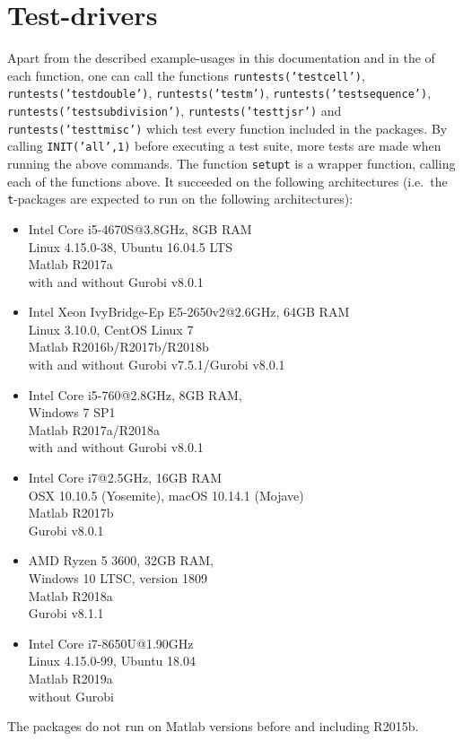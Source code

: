 \section{Test-drivers}
Apart from the described example-usages in this documentation and in the  of each function, 
one can call the functions
\texttt{runtests('testcell')},
\texttt{runtests('testdouble')},
\texttt{runtests('testm')},
\texttt{runtests('testsequence')},
\texttt{runtests('testsubdivision')},
\texttt{runtests('testtjsr')} and
\texttt{runtests('testtmisc')}
which test every function included in the packages. 
By calling \texttt{INIT('all',1)} before executing a test suite, 
more tests are made when running the above commands.
The function \texttt{setupt} is a wrapper function, calling each of the functions above.
It succeeded on the following architectures (i.e.\ the \texttt{t}-packages are expected to run on the following architectures):
\begin{itemize}
\item Intel Core i5-4670S@3.8GHz, 8GB RAM\\
Linux 4.15.0-38,
Ubuntu 16.04.5 LTS\\
Matlab R2017a\\
with and without Gurobi v8.0.1

\item Intel Xeon IvyBridge-Ep E5-2650v2@2.6GHz, 64GB RAM\\
Linux 3.10.0, CentOS Linux 7\\
Matlab R2016b/R2017b/R2018b\\
with and without Gurobi v7.5.1/Gurobi v8.0.1

\item 
Intel Core i5-760@2.8GHz, 8GB RAM,\\
Windows 7 SP1\\
Matlab R2017a/R2018a\\
with and without Gurobi v8.0.1

\item
Intel Core i7@2.5GHz, 16GB RAM\\
OSX 10.10.5 (Yosemite), macOS 10.14.1 (Mojave)\\
Matlab R2017b\\
Gurobi v8.0.1

\item 
AMD Ryzen 5 3600, 32GB RAM,\\
Windows 10 LTSC, version 1809\\
Matlab R2018a\\
Gurobi v8.1.1

\item 
Intel Core i7-8650U@1.90GHz\\
Linux 4.15.0-99, Ubuntu 18.04\\
Matlab R2019a\\
without Gurobi
\end{itemize}
The packages do not run on Matlab versions before and including R2015b.

